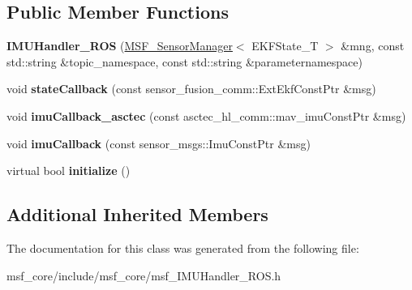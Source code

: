 \subsection*{Public Member Functions}
\begin{DoxyCompactItemize}
\item 
\hypertarget{classmsf__core_1_1IMUHandler__ROS_ae5f7af48a65f50e446ac9286eaa162e8}{{\bfseries I\-M\-U\-Handler\-\_\-\-R\-O\-S} (\hyperlink{classmsf__core_1_1MSF__SensorManager}{M\-S\-F\-\_\-\-Sensor\-Manager}$<$ E\-K\-F\-State\-\_\-\-T $>$ \&mng, const std\-::string \&topic\-\_\-namespace, const std\-::string \&parameternamespace)}\label{classmsf__core_1_1IMUHandler__ROS_ae5f7af48a65f50e446ac9286eaa162e8}

\item 
\hypertarget{classmsf__core_1_1IMUHandler__ROS_a3ccc671b3e20d75c5b841c7834c94d9f}{void {\bfseries state\-Callback} (const sensor\-\_\-fusion\-\_\-comm\-::\-Ext\-Ekf\-Const\-Ptr \&msg)}\label{classmsf__core_1_1IMUHandler__ROS_a3ccc671b3e20d75c5b841c7834c94d9f}

\item 
\hypertarget{classmsf__core_1_1IMUHandler__ROS_a3d43bd281e85ad0c8efa9eb218be2913}{void {\bfseries imu\-Callback\-\_\-asctec} (const asctec\-\_\-hl\-\_\-comm\-::mav\-\_\-imu\-Const\-Ptr \&msg)}\label{classmsf__core_1_1IMUHandler__ROS_a3d43bd281e85ad0c8efa9eb218be2913}

\item 
\hypertarget{classmsf__core_1_1IMUHandler__ROS_a11d2fecc4412b9664283d6e77fcaf31a}{void {\bfseries imu\-Callback} (const sensor\-\_\-msgs\-::\-Imu\-Const\-Ptr \&msg)}\label{classmsf__core_1_1IMUHandler__ROS_a11d2fecc4412b9664283d6e77fcaf31a}

\item 
\hypertarget{classmsf__core_1_1IMUHandler__ROS_ad620c283be06fad82e81903fc527564a}{virtual bool {\bfseries initialize} ()}\label{classmsf__core_1_1IMUHandler__ROS_ad620c283be06fad82e81903fc527564a}

\end{DoxyCompactItemize}
\subsection*{Additional Inherited Members}


The documentation for this class was generated from the following file\-:\begin{DoxyCompactItemize}
\item 
msf\-\_\-core/include/msf\-\_\-core/msf\-\_\-\-I\-M\-U\-Handler\-\_\-\-R\-O\-S.\-h\end{DoxyCompactItemize}
